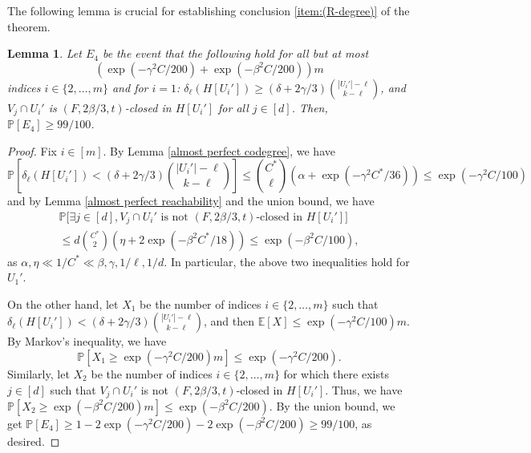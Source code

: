 \documentclass[11pt, letterpaper]{amsart}
\theoremstyle{plain}
\numberwithin{equation}{section}
\newtheorem{lemma}[thm]{Lemma}
\theoremstyle{definition}
\newcommand\card[1]{\left| #1 \right|}
\begin{document}
The following lemma is crucial for establishing conclusion \ref{item:(R-degree)} of the theorem.
        
\begin{lemma}\label{codegree and reachable set of random cluster}
Let $E_4$ be the event that the following hold for all but at most
\[
\left(\exp{\left(-\gamma^2 C/200\right)}+\exp{\left(-\beta^2 C/200\right)}\right)m
\]
indices \(i\in \{2,\dots,m\}\) and for $i=1$: $\delta_{\ell}(H[U_i'])\ge (\delta+2\gamma/3)\binom{|U_i'|-\ell}{k-\ell}$, and $V_j\cap U_i'$ is $(F,2\beta/3,t)$-closed in $H[U_i']$ for all $j\in[d]$.
Then, $\mathbb{P}\left[E_4\right]\ge 99/100$.
\end{lemma}
\begin{proof}
Fix $i\in [m]$.
By Lemma \ref{almost perfect codegree}, we have
\[
\mathbb{P}\left[\delta_{\ell}(H[U_i'])<(\delta+2\gamma/3)\binom{\card{U_i'}-\ell}{k-\ell}\right]\le \binom{C^*}{\ell}\left(\alpha+\exp{\left(-\gamma^2C^*/36\right)}\right)\le \exp{\left(-\gamma^2C/100\right)}
\]
and by Lemma \ref{almost perfect reachability} and the union bound, we have
\begin{align*}
\mathbb{P}\Big[\exists j\in[d],V_j\cap U_i'\text{ is not }(F,2\beta/3,t)\text{-closed in }H[U_i']\Big]\\
\le d\binom{C^*}{2}\left(\eta+2\exp{(-\beta^2C^*/18)}\right)\le \exp{\left(-\beta^2C/100\right)},
\end{align*}
as $\alpha,\eta\ll 1/C^*\ll\beta,\gamma,1/\ell,1/d.$ 
In particular, the above two inequalities hold for \(U_1'\). 
           
On the other hand, let $X_1$ be the number of indices $i\in\{2,\dots,m\}$ such that \(\delta_{\ell}(H[U_i'])< (\delta+2\gamma/3)\binom{|U_i'|-\ell}{k-\ell}\), 
and then $\mathbb{E}[X]\le \exp{(-\gamma^2C/100)}m.$ 
By Markov's inequality, we have
\[
\mathbb{P}[X_1\ge\exp{\left(-\gamma^2 C/200\right)}m]\le \exp{\left(-\gamma^2 C/200\right)}.
\]
Similarly, let $X_2$ be the number of indices $i\in\{2,\dots,m\}$ for which there exists \(j\in [d]\) such that $V_j\cap U_i'$ is not  $(F,2\beta/3,t)$-closed in $H[U_i']$. 
Thus, we have $\mathbb{P}[X_2\ge\exp{\left(-\beta^2 C/200\right)}m]\le \exp{\left(-\beta^2 C/200\right)}.$ 
By the union bound, we get $\mathbb{P}\left[E_4\right]\ge 1-2\exp{\left(-\gamma^2 C/200\right)}-2\exp{\left(-\beta^2 C/200\right)}\ge 99/100$, as desired.
\end{proof}
\end{document}
